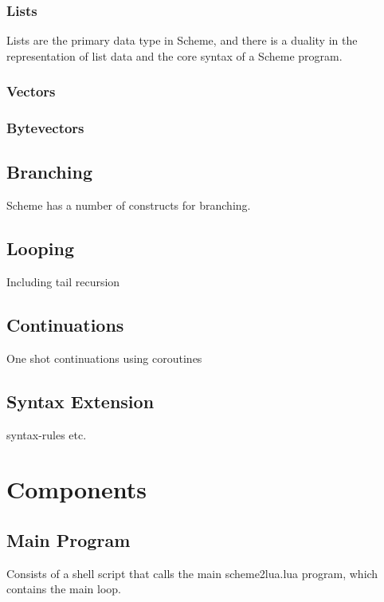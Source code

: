 \subsubsection{Lists}

Lists are the primary data type in Scheme, and there is a duality in the
representation of list data and the core syntax of a Scheme program.

\subsubsection{Vectors}

\subsubsection{Bytevectors}

\subsection{Branching}

Scheme has a number of constructs for branching.

\subsection{Looping}

Including tail recursion

\subsection{Continuations}

One shot continuations using coroutines

\subsection{Syntax Extension}

syntax-rules etc.


\section{Components}

\subsection{Main Program}

Consists of a shell script that calls the main scheme2lua.lua program, which
contains the main loop.

